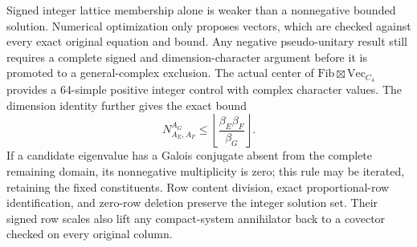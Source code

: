 Signed integer lattice membership alone is weaker than a nonnegative
bounded solution. Numerical optimization only proposes vectors, which are
checked against every exact original equation and bound. Any negative
pseudo-unitary result still requires a complete signed and dimension-character
argument before it is promoted to a general-complex exclusion.
The actual center of $\mathrm{Fib}\boxtimes\mathrm{Vec}_{C_4}$ provides a
64-simple positive integer control with complex character values.
The dimension identity further gives the exact bound
\[
 N_{A_E,A_F}^{A_G}\leq
 \left\lfloor\frac{\beta_E\beta_F}{\beta_G}\right\rfloor.
\]
If a candidate eigenvalue has a Galois conjugate absent from the complete
remaining domain, its nonnegative multiplicity is zero; this rule may be
iterated, retaining the fixed constituents. Row content division, exact
proportional-row identification, and zero-row deletion preserve the integer
solution set. Their signed row scales also lift any compact-system
annihilator back to a covector checked on every original column.
